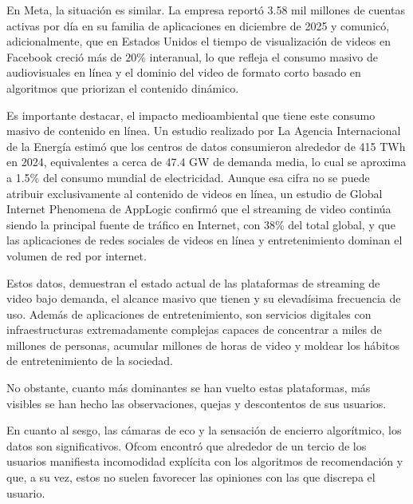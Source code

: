 En Meta, la situación es similar. La empresa \cite{meta_q42025_results} reportó  3.58 mil millones de cuentas activas por día en su familia de aplicaciones en diciembre de 2025 y comunicó, adicionalmente, que en Estados Unidos el tiempo de visualización de videos en Facebook creció más de $20\%$ interanual, lo que refleja el consumo masivo de audiovisuales en línea y el dominio del video de formato corto basado en algoritmos que priorizan el contenido dinámico.  %
 
Es importante destacar, el impacto medioambiental que tiene este consumo masivo de contenido en línea. Un estudio realizado por La Agencia Internacional de la Energía \cite{iea_energy_ai_2025} estimó que los centros de datos consumieron alrededor de 415 TWh en 2024, equivalentes a cerca de 47.4 GW de demanda media, lo cual se aproxima a 1.5\% del consumo mundial de electricidad. Aunque esa cifra no se puede atribuir exclusivamente al contenido de videos en línea, un estudio de Global Internet Phenomena de AppLogic confirmó que el streaming de video continúa siendo la principal fuente de tráfico en Internet, con 38\% del total global, y que las aplicaciones de redes sociales de videos en línea y entretenimiento dominan el volumen de red por internet. %

Estos datos, demuestran el estado actual de las plataformas de streaming de video bajo demanda, el alcance masivo que tienen y su elevadísima frecuencia de uso. Además de aplicaciones de entretenimiento, son servicios digitales con infraestructuras extremadamente complejas capaces de concentrar a miles de millones de personas, acumular millones de horas de video y moldear los hábitos de entretenimiento de la sociedad. 

No obstante, cuanto más dominantes se han vuelto estas plataformas, más visibles se han hecho las observaciones, quejas y descontentos de sus usuarios. 

En cuanto al sesgo, las cámaras de eco y la sensación de encierro algorítmico, los datos son significativos. Ofcom \cite{ofcom_media_use_attitudes_2025} encontró que alrededor de un tercio de los usuarios manifiesta incomodidad explícita con los algoritmos de recomendación y que, a su vez, estos no suelen favorecer las opiniones con las que discrepa el usuario.  %

